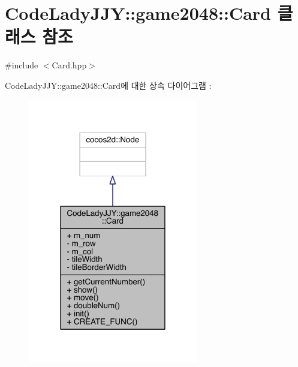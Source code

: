 \hypertarget{class_code_lady_j_j_y_1_1game2048_1_1_card}{}\section{Code\+Lady\+J\+JY\+:\+:game2048\+:\+:Card 클래스 참조}
\label{class_code_lady_j_j_y_1_1game2048_1_1_card}


{\ttfamily \#include $<$Card.\+hpp$>$}



Code\+Lady\+J\+JY\+:\+:game2048\+:\+:Card에 대한 상속 다이어그램 \+: 
\nopagebreak
\begin{figure}[H]
\begin{center}
\leavevmode
\includegraphics[width=210pt]{d1/dc9/class_code_lady_j_j_y_1_1game2048_1_1_card__inherit__graph}
\end{center}
\end{figure}


